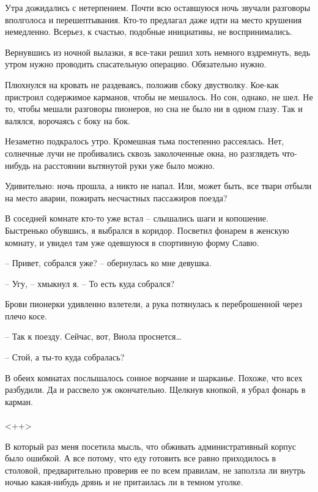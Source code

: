\documentclass[a4paper]{book}
\begin{document}
Утра дожидались с нетерпением. Почти всю оставшуюся ночь звучали разговоры вполголоса и перешептывания. Кто-то предлагал даже идти на место крушения немедленно. Всерьез, к счастью, подобные инициативы, не воспринимались.

Вернувшись из ночной вылазки, я все-таки решил хоть немного вздремнуть, ведь утром нужно проводить спасательную операцию. Обязательно нужно. 

Плюхнулся на кровать не раздеваясь, положив сбоку двустволку. Кое-как пристроил содержимое карманов, чтобы не мешалось. Но сон, однако, не шел. Не то, чтобы мешали разговоры пионеров, но сна не было ни в одном глазу. Так и валялся, ворочаясь с боку на бок.

Незаметно подкралось утро. Кромешная тьма постепенно рассеялась. Нет, солнечные лучи не пробивались сквозь заколоченные окна, но разглядеть что-нибудь на расстоянии вытянутой руки уже было можно.

Удивительно: ночь прошла, а никто не напал. Или, может быть, все твари отбыли на место аварии, пожирать несчастных пассажиров поезда?

В соседней комнате кто-то уже встал -- слышались шаги и копошение. Быстренько обувшись, я выбрался в коридор. Посветил фонарем в женскую комнату, и увидел там уже одевшуюся в спортивную форму Славю.

-- Привет, собрался уже? -- обернулась ко мне девушка.

-- Угу, -- хмыкнул я. -- То есть куда собрался?

Брови пионерки удивленно взлетели, а рука потянулась к переброшенной через плечо косе. 

-- Так к поезду. Сейчас, вот, Виола проснется\ldots

-- Стой, а ты-то куда собралась?

В обеих комнатах послышалось сонное ворчание и шарканье. Похоже, что всех разбудили. Да и рассвело уж окончательно. Щелкнув кнопкой, я убрал фонарь в карман.

\paragraph{}<++>

В который раз меня посетила мысль, что обживать административный корпус было ошибкой. А все потому, что еду готовить все равно приходилось в столовой, предварительно проверив ее по всем правилам, не заползла ли внутрь ночью какая-нибудь дрянь и не притаилась ли в темном уголке. 
\end{document}
